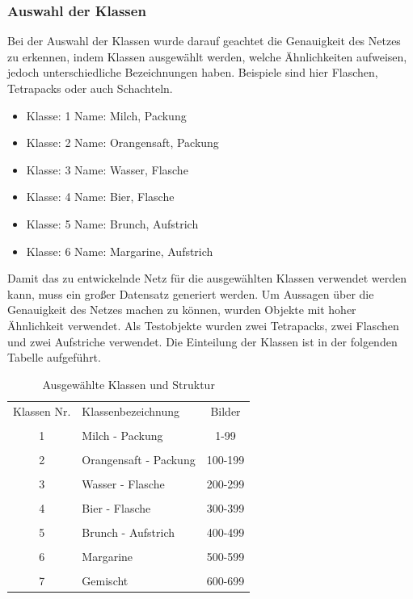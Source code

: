 \documentclass[a4paper,12pt,oneside]{article}
\begin{document}
\subsubsection{Auswahl der Klassen} 
Bei der Auswahl der Klassen wurde darauf geachtet die Genauigkeit des Netzes zu erkennen, indem Klassen ausgewählt werden, welche Ähnlichkeiten aufweisen, jedoch unterschiedliche Bezeichnungen haben. Beispiele sind hier Flaschen, Tetrapacks oder auch Schachteln.\\
\begin{itemize}
\label{klassen1}
\item Klasse: 1 Name: \glqq Milch, Packung\grqq

\item Klasse: 2 Name: \glqq Orangensaft, Packung\grqq

\item Klasse: 3 Name: \glqq Wasser, Flasche\grqq

\item Klasse: 4 Name: \glqq Bier, Flasche\grqq

\item Klasse: 5 Name: \glqq Brunch, Aufstrich\grqq

\item Klasse: 6 Name: \glqq Margarine, Aufstrich\grqq
\end{itemize} \vspace{9 cm}
Damit das zu entwickelnde Netz für die ausgewählten Klassen verwendet werden kann, muss ein großer Datensatz generiert werden. Um Aussagen über die Genauigkeit des Netzes machen zu können, wurden Objekte mit hoher Ähnlichkeit verwendet. Als Testobjekte wurden zwei Tetrapacks, zwei Flaschen und zwei Aufstriche verwendet. Die Einteilung der Klassen ist in der folgenden Tabelle aufgeführt.
\\
\begin{table}
[h]
\centering
\caption{Ausgewählte Klassen und Struktur}
\label{klassen2}
\begin{tabular}{|c|l|c|}
    Klassen Nr.   &   Klassenbezeichnung   &   Bilder   \\
  & & \\
    1   &   Milch - Packung   &   1-99   \\
  & & \\
    2   &   Orangensaft - Packung   &   100-199   \\
  & & \\
    3   &   Wasser - Flasche   &   200-299   \\
  & & \\
    4   &   Bier - Flasche   &   300-399   \\
  & & \\
    5   &   Brunch - Aufstrich   &   400-499   \\
  & & \\
    6   &   Margarine   &   500-599   \\
  & & \\
    7   &   Gemischt   &   600-699
\end{tabular}
\end{table}
\end{document}
